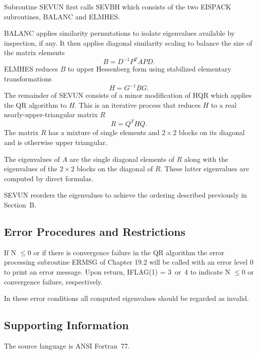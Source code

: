 \documentclass[twoside]{MATH77}
\begin{document}
Subroutine SEVUN first calls SEVBH which consists of the two EISPACK
subroutines, BALANC and ELMHES.

BALANC applies similarity permutations to isolate eigenvalues available by
inspection, if any. It then applies diagonal similarity scaling to balance
the size of the matrix elements%
\begin{equation*}
B=D^{-1}P^TAPD.
\end{equation*}
ELMHES reduces $B$ to upper Hessenberg form using stabilized elementary
transformations%
\begin{equation*}
H=G^{-1}BG.
\end{equation*}
The remainder of SEVUN consists of a minor modification of HQR
which applies the QR algorithm to $H$. This is an iterative process that
reduces $H$ to a real nearly-upper-triangular matrix $R$%
\begin{equation*}
R=Q^THQ.
\end{equation*}
The matrix $R$ has a mixture of single elements and $2 \times 2$ blocks on its
diagonal and is otherwise upper triangular.

The eigenvalues of $A$ are the single diagonal elements of $R$ along with the
eigenvalues of the $2 \times 2$ blocks on the diagonal of $R$. These latter
eigenvalues are computed by direct formulas.

SEVUN reorders the eigenvalues to achieve the ordering described
previously in Section~B.




\subsection{Error Procedures and Restrictions}

If N $\leq 0$ or if there is convergence failure in the QR algorithm the
error processing subroutine ERMSG of Chapter 19.2 will be called with an
error level 0 to print an error message. Upon return, IFLAG(1) = 3~or~4 to
indicate N $\leq  0$ or convergence failure, respectively.

In these error conditions all computed eigenvalues should be regarded as
invalid.

\subsection{Supporting Information}

The source language is ANSI Fortran~77.
\end{document}
